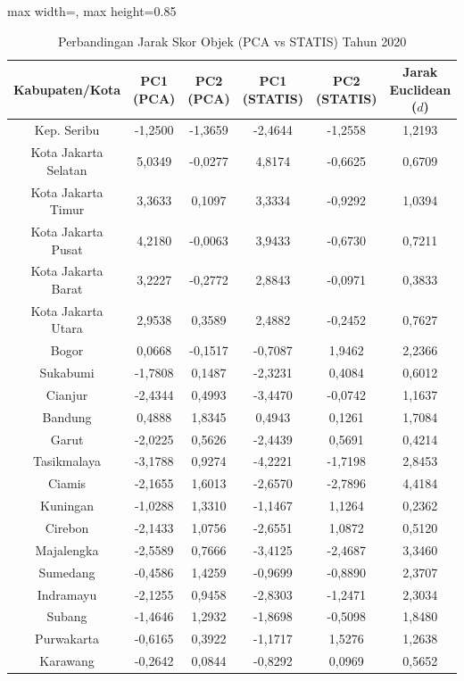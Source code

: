 \begin{table}[H]
\centering
\caption{Perbandingan Jarak Skor Objek (PCA vs STATIS) Tahun 2020} \label{tab:app2jarak_skor_2020}
\begin{adjustbox}{max width=\textwidth, max height=0.85\textheight}
\begin{tabular}{|c|c|c|c|c|c|}
\hline
\textbf{Kabupaten/Kota} & \textbf{PC1 (PCA)} & \textbf{PC2 (PCA)} & \textbf{PC1 (STATIS)} & \textbf{PC2 (STATIS)} & \textbf{Jarak Euclidean ($d$)} \\
\hline
Kep. Seribu & -1,2500 & -1,3659 & -2,4644 & -1,2558 & 1,2193 \\
Kota Jakarta Selatan & 5,0349 & -0,0277 & 4,8174 & -0,6625 & 0,6709 \\
Kota Jakarta Timur & 3,3633 & 0,1097 & 3,3334 & -0,9292 & 1,0394 \\
Kota Jakarta Pusat & 4,2180 & -0,0063 & 3,9433 & -0,6730 & 0,7211 \\
Kota Jakarta Barat & 3,2227 & -0,2772 & 2,8843 & -0,0971 & 0,3833 \\
Kota Jakarta Utara & 2,9538 & 0,3589 & 2,4882 & -0,2452 & 0,7627 \\
Bogor & 0,0668 & -0,1517 & -0,7087 & 1,9462 & 2,2366 \\
Sukabumi & -1,7808 & 0,1487 & -2,3231 & 0,4084 & 0,6012 \\
Cianjur & -2,4344 & 0,4993 & -3,4470 & -0,0742 & 1,1637 \\
Bandung & 0,4888 & 1,8345 & 0,4943 & 0,1261 & 1,7084 \\
Garut & -2,0225 & 0,5626 & -2,4439 & 0,5691 & 0,4214 \\
Tasikmalaya & -3,1788 & 0,9274 & -4,2221 & -1,7198 & 2,8453 \\
Ciamis & -2,1655 & 1,6013 & -2,6570 & -2,7896 & 4,4184 \\
Kuningan & -1,0288 & 1,3310 & -1,1467 & 1,1264 & 0,2362 \\
Cirebon & -2,1433 & 1,0756 & -2,6551 & 1,0872 & 0,5120 \\
Majalengka & -2,5589 & 0,7666 & -3,4125 & -2,4687 & 3,3460 \\
Sumedang & -0,4586 & 1,4259 & -0,9699 & -0,8890 & 2,3707 \\
Indramayu & -2,1255 & 0,9458 & -2,8303 & -1,2471 & 2,3034 \\
Subang & -1,4646 & 1,2932 & -1,8698 & -0,5098 & 1,8480 \\
Purwakarta & -0,6165 & 0,3922 & -1,1717 & 1,5276 & 1,2638 \\
Karawang & -0,2642 & 0,0844 & -0,8292 & 0,0969 & 0,5652 \\

\end{tabular}
\end{adjustbox}
\end{table}
